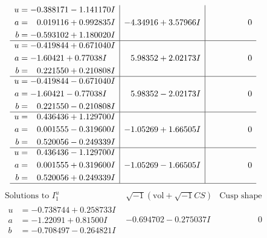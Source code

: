 \documentclass[1p]{elsarticle_modified}
\theoremstyle{definition}
\newcommand{\I}{\sqrt{-1}}
\begin{document}
$$\begin{array}{c|c|c}
\begin{aligned}
u &= -0.388171 - 1.141170 I \\
a &= \phantom{-}0.019116 + 0.992835 I \\
b &= -0.593102 + 1.180020 I\end{aligned}
 & -4.34916 + 3.57966 I & \phantom{-0.000000 } 0 \\ \hline\begin{aligned}
u &= -0.419844 + 0.671040 I \\
a &= -1.60421 + 0.77038 I \\
b &= \phantom{-}0.221550 + 0.210808 I\end{aligned}
 & \phantom{-}5.98352 + 2.02173 I & \phantom{-0.000000 } 0 \\ \hline\begin{aligned}
u &= -0.419844 - 0.671040 I \\
a &= -1.60421 - 0.77038 I \\
b &= \phantom{-}0.221550 - 0.210808 I\end{aligned}
 & \phantom{-}5.98352 - 2.02173 I & \phantom{-0.000000 } 0 \\ \hline\begin{aligned}
u &= \phantom{-}0.436436 + 1.129700 I \\
a &= \phantom{-}0.001555 - 0.319600 I \\
b &= \phantom{-}0.520056 - 0.249339 I\end{aligned}
 & -1.05269 + 1.66505 I & \phantom{-0.000000 } 0 \\ \hline\begin{aligned}
u &= \phantom{-}0.436436 - 1.129700 I \\
a &= \phantom{-}0.001555 + 0.319600 I \\
b &= \phantom{-}0.520056 + 0.249339 I\end{aligned}
 & -1.05269 - 1.66505 I & \phantom{-0.000000 } 0\\
 \hline 
 \end{array}$$\newpage$$\begin{array}{c|c|c}  
\text{Solutions to }I^u_{1}& \I (\text{vol} + \sqrt{-1}CS) & \text{Cusp shape}\\
 \hline 
\begin{aligned}
u &= -0.738744 + 0.258733 I \\
a &= -1.22091 + 0.81500 I \\
b &= -0.708497 - 0.264821 I\end{aligned}
 & -0.694702 - 0.275037 I & \phantom{-0.000000 } 0 \\ \hline\begin{aligned}

\end{aligned}
\end{array}$$
\end{document}
